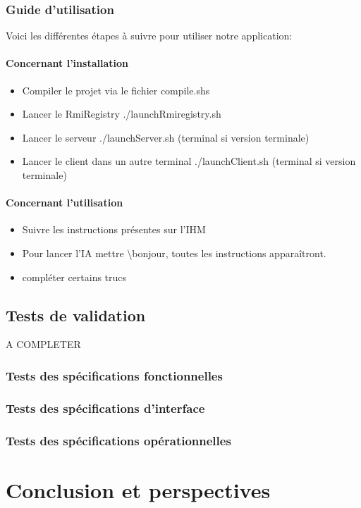 \documentclass[11pt,dvipsnames,svgnames]{report}
\begin{document}
\subsection{Guide d'utilisation}
Voici les différentes étapes à suivre pour utiliser notre application:
\subsubsection{Concernant l'installation}
\begin{itemize}
\item Compiler le projet via le fichier compile.shs
\item Lancer le RmiRegistry ./launchRmiregistry.sh
\item Lancer le serveur ./launchServer.sh (terminal si version terminale)
\item Lancer le client dans un autre terminal ./launchClient.sh (terminal si version terminale)
\end{itemize}

\subsubsection{Concernant l'utilisation}
\begin{itemize}
\item Suivre les instructions présentes sur l'IHM
\item Pour lancer l'IA mettre \textbackslash bonjour, toutes les instructions apparaîtront.
\item compléter certains trucs
\end{itemize}

\section{Tests de validation}
A COMPLETER
\subsection{Tests des spécifications fonctionnelles}
\subsection{Tests des spécifications d'interface}
\subsection{Tests des spécifications opérationnelles}

\chapter{Conclusion et perspectives}
\end{document}
